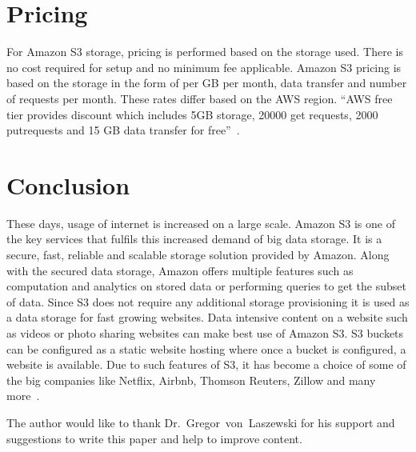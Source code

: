 \section{Pricing}

For Amazon S3 storage, pricing is performed based on the storage used.
There is no cost required for setup and no minimum fee
applicable. Amazon S3 pricing is based on the storage in the form of
per GB per month, data transfer and number of requests per
month. These rates differ based on the AWS region. ``AWS free tier
provides discount which includes 5GB storage, 20000 get requests, 2000
putrequests and 15 GB data transfer for
free''~\cite{hid-sp18-420-amazon-S3-pricing}.

\section{Conclusion}

These days, usage of internet is increased on a large scale. Amazon S3
is one of the key services that fulfils this increased demand of big
data storage. It is a secure, fast, reliable and scalable storage
solution provided by Amazon.  Along with the secured data storage,
Amazon offers multiple features such as computation and analytics on
stored data or performing queries to get the subset of data.  Since S3
does not require any additional storage provisioning it is used as a
data storage for fast growing websites. Data intensive content on a
website such as videos or photo sharing websites can make best use of
Amazon S3. S3 buckets can be configured as a static website hosting
where once a bucket is configured, a website is available.  Due to
such features of S3, it has become a choice of some of the big
companies like Netflix, Airbnb, Thomson Reuters, Zillow and many
more~\cite{hid-sp18-420-amazon-S3}.

\begin{acks}

  The author would like to thank Dr.~Gregor~von~Laszewski for his
  support and suggestions to write this paper and help to improve
  content.

\end{acks}



 
